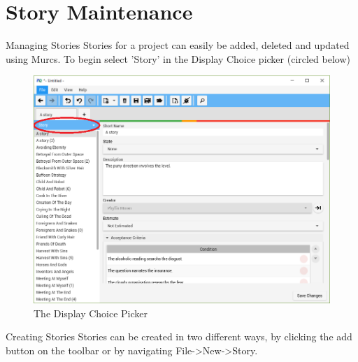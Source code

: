 \section{Story Maintenance}

Managing Stories
\newline
Stories for a project can easily be added, deleted and updated using Murcs. To begin select 'Story' in the Display Choice picker (circled below)

\begin{figure}[H]
\centering
\includegraphics[width=\textwidth]{images/screenshots/stories1.PNG}
\caption{The Display Choice Picker}
\label{fig:new_project}
\end{figure}

Creating Stories
\newline
Stories can be created in two different ways, by clicking the add button on the toolbar or by navigating File-\textgreater New-\textgreater Story.

